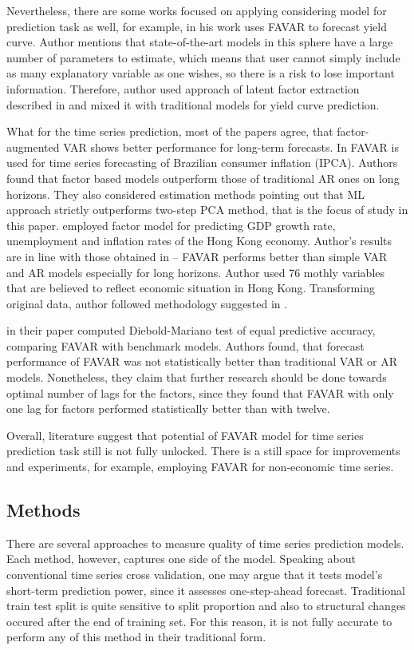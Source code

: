 \documentclass[a4paper, 14pt]{article}
\begin{document}
Nevertheless, there are some works focused on applying considering model for prediction task as well, for example,  \cite{monch2008forecasting} in his work uses FAVAR to forecast yield curve. Author mentions that state-of-the-art models in this sphere have a large number of parameters to estimate, which means that user cannot simply include as many explanatory variable as one wishes, so there is a risk to lose important information. Therefore, author used approach of latent factor extraction described in \cite{bernanke2005measuring} and mixed it with traditional models for yield curve prediction. 

What for the time series prediction, most of the papers agree, that factor-augmented VAR shows better performance for long-term forecasts. In \cite{figueiredo2013forecasting} FAVAR is used for time series forecasting of Brazilian consumer inflation (IPCA). Authors found that factor based models outperform those of traditional AR ones on long horizons. They also considered estimation methods pointing out that ML approach strictly outperforms two-step PCA method, that is the focus of study in this paper. \cite{pang2010forecasting} employed factor model for predicting GDP growth rate, unemployment and inflation rates of the Hong Kong economy. Author's results are in line with those obtained in \cite{figueiredo2013forecasting} -- FAVAR performs better than simple VAR and AR models especially for long horizons. Author used 76 mothly variables that are believed to reflect economic situation in Hong Kong. Transforming original data, author followed methodology suggested in \cite{stock2005implications}.

\cite{berggren2016can} in their paper computed Diebold-Mariano test of equal predictive accuracy, comparing FAVAR with benchmark models. Authors found, that forecast performance of FAVAR was not statistically better than traditional VAR or AR models. Nonetheless, they claim that further research should be done towards optimal number of lags for the factors, since they found that FAVAR with only one lag for factors performed statistically better than with twelve.  

Overall, literature suggest that potential of FAVAR model for time series prediction task still is not fully unlocked. There is a still space for improvements and experiments, for example, employing FAVAR for non-economic time series.

\subsection{Methods}
There are several approaches to measure quality of time series prediction models. Each method, however, captures one side of the model. Speaking about conventional time series cross validation, one may argue that it tests model's short-term prediction power, since it assesses one-step-ahead forecast. Traditional train test split is quite sensitive to split proportion and also to structural changes occured after the end of training set. For this reason, it is not fully accurate to perform any of this method in their traditional form. 
\end{document}
